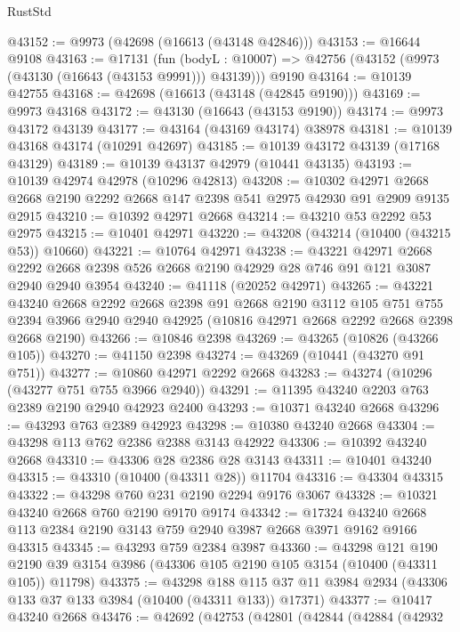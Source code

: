 \begin{lexlean}{RustStd}
\begin{coremodule}
@43152 := @9973 (@42698 (@16613 (@43148 @42846)))
@43153 := @16644 @9108
@43163 := @17131
    (fun (bodyL : @10007) => @42756 (@43152 (@9973 (@43130 (@16643 (@43153 @9991))) @43139)))
    @9190
@43164 := @10139 @42755
@43168 := @42698 (@16613 (@43148 (@42845 @9190)))
@43169 := @9973 @43168
@43172 := @43130 (@16643 (@43153 @9190))
@43174 := @9973 @43172 @43139
@43177 := @43164 (@43169 @43174) @38978
@43181 := @10139 @43168 @43174 (@10291 @42697)
@43185 := @10139 @43172 @43139 (@17168 @43129)
@43189 := @10139 @43137 @42979 (@10441 @43135)
@43193 := @10139 @42974 @42978 (@10296 @42813)
@43208 := @10302
    @42971
    @2668
    @2668
    @2190
    @2292
    @2668
    @147
    @2398
    @541
    @2975
    @42930
    @91
    @2909
    @9135
    @2915
@43210 := @10392 @42971 @2668
@43214 := @43210 @53 @2292 @53 @2975
@43215 := @10401 @42971
@43220 := @43208 (@43214 (@10400 (@43215 @53)) @10660)
@43221 := @10764 @42971
@43238 := @43221
    @42971
    @2668
    @2292
    @2668
    @2398
    @526
    @2668
    @2190
    @42929
    @28
    @746
    @91
    @121
    @3087
    @2940
    @2940
    @3954
@43240 := @41118 (@20252 @42971)
@43265 := @43221
    @43240
    @2668
    @2292
    @2668
    @2398
    @91
    @2668
    @2190
    @3112
    @105
    @751
    @755
    @2394
    @3966
    @2940
    @2940
    @42925
    (@10816 @42971 @2668 @2292 @2668 @2398 @2668 @2190)
@43266 := @10846 @2398
@43269 := @43265 (@10826 (@43266 @105))
@43270 := @41150 @2398
@43274 := @43269 (@10441 (@43270 @91 @751))
@43277 := @10860 @42971 @2292 @2668
@43283 := @43274 (@10296 (@43277 @751 @755 @3966 @2940))
@43291 := @11395 @43240 @2203 @763 @2389 @2190 @2940 @42923 @2400
@43293 := @10371 @43240 @2668
@43296 := @43293 @763 @2389 @42923
@43298 := @10380 @43240 @2668
@43304 := @43298 @113 @762 @2386 @2388 @3143 @42922
@43306 := @10392 @43240 @2668
@43310 := @43306 @28 @2386 @28 @3143
@43311 := @10401 @43240
@43315 := @43310 (@10400 (@43311 @28)) @11704
@43316 := @43304 @43315
@43322 := @43298 @760 @231 @2190 @2294 @9176 @3067
@43328 := @10321 @43240 @2668 @760 @2190 @9170 @9174
@43342 := @17324 @43240 @2668 @113 @2384 @2190 @3143 @759 @2940 @3987 @2668 @3971 @9162 @9166 @43315
@43345 := @43293 @759 @2384 @3987
@43360 := @43298
    @121
    @190
    @2190
    @39
    @3154
    @3986
    (@43306 @105 @2190 @105 @3154 (@10400 (@43311 @105)) @11798)
@43375 := @43298
    @188
    @115
    @37
    @11
    @3984
    @2934
    (@43306 @133 @37 @133 @3984 (@10400 (@43311 @133)) @17371)
@43377 := @10417 @43240 @2668
@43476 := @42692
    (@42753
      (@42801
        (@42844
          (@42884
            (@42932

\end{coremodule}
\end{lexlean}
